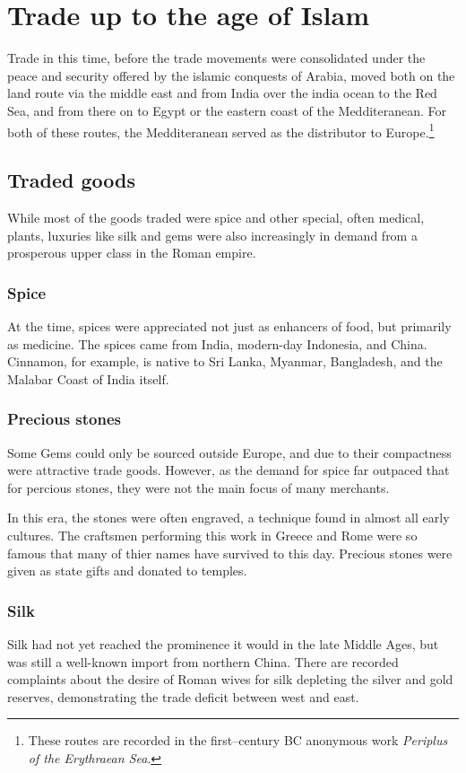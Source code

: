 \documentclass[11pt, a4paper, headings=standardclasses]{scrartcl}
\begin{document}
\section{Trade up to the age of Islam}
Trade in this time, before the trade movements were consolidated under the peace and security offered by the islamic conquests of Arabia, moved both on the land route via the middle east and from India over the india ocean to the Red Sea, and from there on to Egypt or the eastern coast of the Medditeranean.\autocite[Chapter 7]{Rome} For both of these routes, the Medditeranean served as the distributor to Europe.\footnote{These routes are recorded in the first--century BC anonymous work \emph{Periplus of the Erythraean Sea}.}

\subsection{Traded goods}
While most of the goods traded were spice and other special, often medical, plants, luxuries like silk and gems were also increasingly in demand from a prosperous upper class in the Roman empire.\autocite{RIS}
\subsubsection{Spice}
At the time, spices were appreciated not just as enhancers of food, but primarily as medicine\autocite{MST}. The spices came from India, modern-day Indonesia, and China. Cinnamon, for example, is native to Sri Lanka, Myanmar, Bangladesh, and the Malabar Coast of India itself\autocite{Cinnamon}.
\subsubsection{Precious stones}
Some Gems could only be sourced outside Europe, and due to their compactness were attractive trade goods. However, as the demand for spice far outpaced that for percious stones\autocite{Rome}, they were not the main focus of many merchants.

In this era, the stones were often engraved, a technique found in almost all early cultures. The craftsmen performing this work in Greece and Rome were so famous that many of thier names have survived to this day. Precious stones were given as state gifts and donated to temples.\autocite{RG}
\subsubsection{Silk}
Silk had not yet reached the prominence it would in the late Middle Ages, but was still a well-known import from northern China. There are recorded complaints about the desire of Roman wives for silk depleting the silver and gold reserves, demonstrating the trade deficit between west and east.\autocite[Chapter 13]{Rome}
\end{document}
